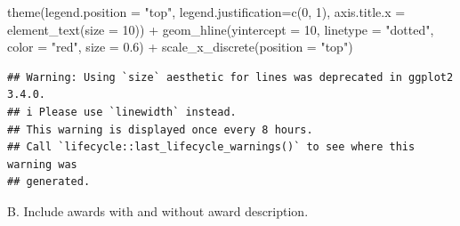 \documentclass[
]{article}
\newenvironment{Shaded}{\begin{snugshade}}{\end{snugshade}}
\newcommand{\AttributeTok}[1]{\textcolor[rgb]{0.77,0.63,0.00}{#1}}
\newcommand{\DecValTok}[1]{\textcolor[rgb]{0.00,0.00,0.81}{#1}}
\newcommand{\FloatTok}[1]{\textcolor[rgb]{0.00,0.00,0.81}{#1}}
\newcommand{\FunctionTok}[1]{\textcolor[rgb]{0.00,0.00,0.00}{#1}}
\newcommand{\NormalTok}[1]{#1}
\newcommand{\SpecialCharTok}[1]{\textcolor[rgb]{0.00,0.00,0.00}{#1}}
\newcommand{\StringTok}[1]{\textcolor[rgb]{0.31,0.60,0.02}{#1}}
\begin{document}
\begin{Shaded}
\begin{Highlighting}[]
    \FunctionTok{theme}\NormalTok{(}\AttributeTok{legend.position =} \StringTok{"top"}\NormalTok{, }\AttributeTok{legend.justification=}\FunctionTok{c}\NormalTok{(}\DecValTok{0}\NormalTok{, }\DecValTok{1}\NormalTok{), }\AttributeTok{axis.title.x =} \FunctionTok{element\_text}\NormalTok{(}\AttributeTok{size =} \DecValTok{10}\NormalTok{)) }\SpecialCharTok{+}
    \FunctionTok{geom\_hline}\NormalTok{(}\AttributeTok{yintercept =} \DecValTok{10}\NormalTok{, }\AttributeTok{linetype =} \StringTok{"dotted"}\NormalTok{, }\AttributeTok{color =} \StringTok{"red"}\NormalTok{, }\AttributeTok{size =} \FloatTok{0.6}\NormalTok{) }\SpecialCharTok{+} 
    \FunctionTok{scale\_x\_discrete}\NormalTok{(}\AttributeTok{position =} \StringTok{"top"}\NormalTok{)}
\end{Highlighting}
\end{Shaded}

\begin{verbatim}
## Warning: Using `size` aesthetic for lines was deprecated in ggplot2 3.4.0.
## i Please use `linewidth` instead.
## This warning is displayed once every 8 hours.
## Call `lifecycle::last_lifecycle_warnings()` to see where this warning was
## generated.
\end{verbatim}

B. Include awards with and without award description.
\end{document}

